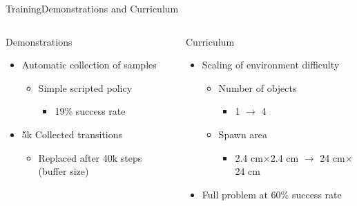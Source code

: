 \begin{frame}{Training}{Demonstrations and Curriculum}
    \begin{columns}%
        \begin{column}{0.5\textwidth}%
            \begin{block}{Demonstrations}
                \begin{itemize}
                    \item Automatic collection of samples
                          \begin{itemize}
                              \item Simple scripted policy
                                    \begin{itemize}
                                        \item 19\% success rate
                                    \end{itemize}
                          \end{itemize}
                    \item 5k Collected transitions
                          \begin{itemize}
                              \item Replaced after 40k steps (buffer size)
                          \end{itemize}
                \end{itemize}
            \end{block}
        \end{column}
        \begin{column}{0.5\textwidth}%
            \begin{block}{Curriculum}
                \begin{itemize}
                    \item Scaling of environment difficulty
                          \begin{itemize}
                              \item Number of objects
                                    \begin{itemize}
                                        \item 1 \(\rightarrow\) 4
                                    \end{itemize}
                              \item Spawn area
                                    \begin{itemize}
                                        \item 2.4 cm\(\times\)2.4 cm \(\rightarrow\) 24 cm\(\times\)24 cm
                                    \end{itemize}
                          \end{itemize}
                    \item Full problem at 60\% success rate
                \end{itemize}
            \end{block}
        \end{column}
    \end{columns}
\end{frame}
